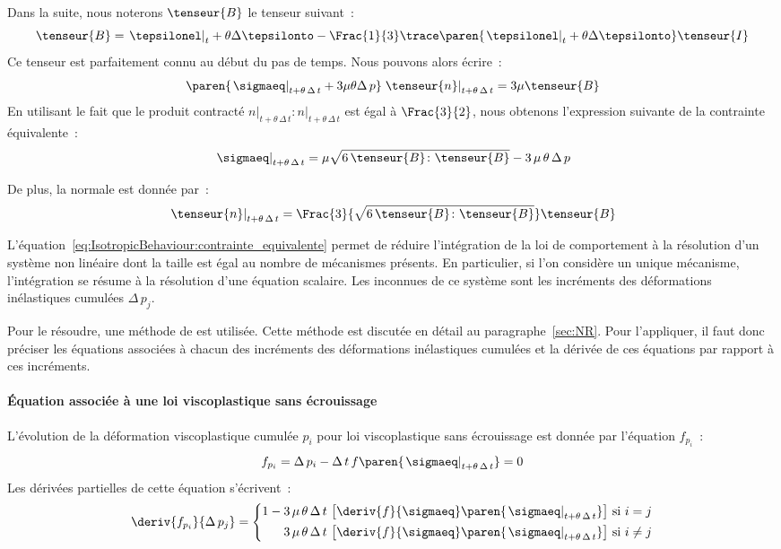 \documentclass[rectoverso,pleiades,pstricks,leqno,anti]{texmf/note_technique_2010}
\newcommand{\debutpas}[1]{\ensuremath{\left.#1\right|_{t}}}
\newcommand{\milieupas}[1]{\ensuremath{\left.#1\right|_{t+\theta\, \Delta\, t}}}
\begin{document}
Dans la suite, nous noterons \(\tenseur{B}\) le tenseur suivant~:
\[
\tenseur{B}=\debutpas{\tepsilonel}+\theta\Delta\tepsilonto-\Frac{1}{3}\trace\paren{\debutpas{\tepsilonel}+\theta\Delta\tepsilonto}\tenseur{I}
\]
Ce tenseur est parfaitement connu au début du pas de temps. Nous pouvons
alors écrire~:
\[
\paren{\milieupas{\sigmaeq}+3\mu\theta\Delta\,p}\milieupas{\tenseur{n}}=3\mu\tenseur{B}
\]
En utilisant le fait que le produit contracté
\(\milieupas{n}\colon\milieupas{n}\) est égal à
\(\Frac{3}{2}\), nous obtenons
l'expression suivante de la contrainte équivalente~:
\begin{equation}
  \label{eq:IsotropicBehaviour:contrainte_equivalente}
  \milieupas{\sigmaeq}=\mu\sqrt{6\,\tenseur{B}\colon\tenseur{B}}-3\,\mu\,\theta\,\Delta\,p
\end{equation}

De plus, la normale est donnée par~:
\begin{equation}
  \label{eq:IsotropicBehaviour:normale}
  \milieupas{\tenseur{n}}=\Frac{3}{\sqrt{6\,\tenseur{B}\colon\tenseur{B}}}\tenseur{B}
\end{equation}

L'équation~\eqref{eq:IsotropicBehaviour:contrainte_equivalente} permet
de réduire l'intégration de la loi de comportement à la résolution d'un
système non linéaire dont la taille est égal au nombre de mécanismes
présents. En particulier, si l'on considère un unique mécanisme,
l'intégration se résume à la résolution d'une équation scalaire. Les
inconnues de ce système sont les incréments des déformations
inélastiques cumulées \(\Delta\, p_{j}\).

Pour le résoudre, une méthode de  est utilisée.
Cette méthode est discutée en détail au paragraphe~\ref{sec:NR}. Pour
l'appliquer, il faut donc préciser les équations associées à chacun des
incréments des déformations inélastiques cumulées et la dérivée de ces
équations par rapport à ces incréments.

\paragraph{Équation associée à une loi viscoplastique sans écrouissage}
L'évolution de la déformation viscoplastique cumulée \(p_{i}\) pour loi
viscoplastique sans écrouissage est donnée par l'équation \(f_{p_{i}}\)~:
\[
f_{p_{i}} = \Delta\,p_{i}-\Delta\,t\,f\paren{\milieupas{\sigmaeq}}=0
\]
Les dérivées partielles de cette équation s'écrivent~:
\[
\deriv{f_{p_{i}}}{\Delta\, p_{j}}=
\left\{
\begin{aligned}
1-3\,\mu\,\theta\,\Delta\,t\,\left[\deriv{f}{\sigmaeq}\paren{\milieupas{\sigmaeq}}\right] & \text{ si } i=j \\
3\,\mu\,\theta\,\Delta\,t\,\left[\deriv{f}{\sigmaeq}\paren{\milieupas{\sigmaeq}}\right] & \text{ si } i\neq j
\end{aligned}
\right.
\]
\end{document}
